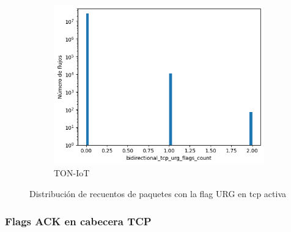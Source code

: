 \begin{figure}[H]
    \hfill
    \begin{subfigure}[b]{0.32\textwidth}
        \centering
        \includegraphics[width=\linewidth]{media/packet_pincer_toniot/bidirectional_tcp_urg_flags_count_linear_x_log_y.png}
        \caption{TON-IoT}
    \end{subfigure}
       \caption{Distribución de recuentos de paquetes con la flag URG en \acrshort{tcp} activa}
       \label{fig:packet_pincer_bidirectional_tcp_urg_flags_count}
\end{figure}

\subsubsection{Flags ACK en cabecera TCP}

